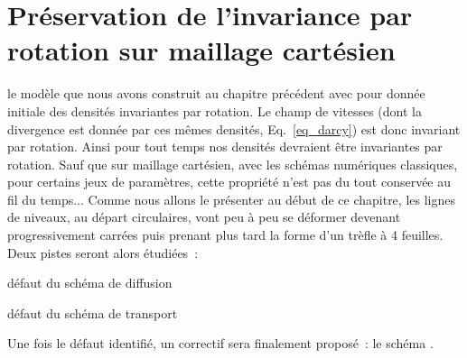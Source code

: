 \documentclass[main.tex]{subfiles}
\begin{document}
\chapter{Préservation de l'invariance par rotation sur maillage cartésien \label{chap:trefle}}

%

 le modèle que nous avons construit au chapitre précédent avec pour donnée initiale des densités invariantes par rotation. Le champ de vitesses (dont la divergence est  donnée par ces mêmes densités, \cf Eq.~\eqref{eq_darcy}) est donc invariant par rotation. Ainsi pour tout temps nos densités devraient être invariantes par rotation. Sauf que sur maillage cartésien, avec les schémas numériques classiques, pour certains jeux de paramètres,  cette propriété n'est pas du tout conservée au fil du temps... Comme nous allons le présenter au début de ce chapitre, les lignes de niveaux, au départ circulaires, vont peu à peu se déformer devenant progressivement carrées puis prenant plus tard la forme d'un trèfle à 4 feuilles.  
Deux pistes seront alors étudiées~:
\begin{myitemize}
\item défaut du schéma de diffusion
\item défaut du schéma de transport
\end{myitemize}

\noindent Une fois le défaut identifié, un correctif sera finalement proposé~: le schéma \twinweno. 
\end{document}
